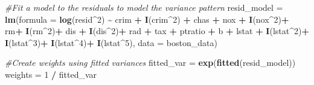 \documentclass[
]{article}
\newenvironment{Shaded}{\begin{snugshade}}{\end{snugshade}}
\newcommand{\AttributeTok}[1]{\textcolor[rgb]{0.13,0.29,0.53}{#1}}
\newcommand{\CommentTok}[1]{\textcolor[rgb]{0.56,0.35,0.01}{\textit{#1}}}
\newcommand{\DecValTok}[1]{\textcolor[rgb]{0.00,0.00,0.81}{#1}}
\newcommand{\FunctionTok}[1]{\textcolor[rgb]{0.13,0.29,0.53}{\textbf{#1}}}
\newcommand{\NormalTok}[1]{#1}
\newcommand{\OtherTok}[1]{\textcolor[rgb]{0.56,0.35,0.01}{#1}}
\newcommand{\SpecialCharTok}[1]{\textcolor[rgb]{0.81,0.36,0.00}{\textbf{#1}}}
\begin{document}
\begin{Shaded}
\begin{Highlighting}[]
\CommentTok{\#Fit a model to the residuals to model the variance pattern}
\NormalTok{resid\_model }\OtherTok{=} \FunctionTok{lm}\NormalTok{(}\AttributeTok{formula =} \FunctionTok{log}\NormalTok{(resid}\SpecialCharTok{\^{}}\DecValTok{2}\NormalTok{) }\SpecialCharTok{\textasciitilde{}}\NormalTok{ crim }\SpecialCharTok{+} \FunctionTok{I}\NormalTok{(crim}\SpecialCharTok{\^{}}\DecValTok{2}\NormalTok{) }\SpecialCharTok{+}\NormalTok{ chas }\SpecialCharTok{+}\NormalTok{ nox }\SpecialCharTok{+} \FunctionTok{I}\NormalTok{(nox}\SpecialCharTok{\^{}}\DecValTok{2}\NormalTok{)}\SpecialCharTok{+}\NormalTok{ rm}\SpecialCharTok{+} \FunctionTok{I}\NormalTok{(rm}\SpecialCharTok{\^{}}\DecValTok{2}\NormalTok{)}\SpecialCharTok{+}\NormalTok{ dis }\SpecialCharTok{+} \FunctionTok{I}\NormalTok{(dis}\SpecialCharTok{\^{}}\DecValTok{2}\NormalTok{)}\SpecialCharTok{+}\NormalTok{ rad }\SpecialCharTok{+}\NormalTok{ tax }\SpecialCharTok{+}\NormalTok{ ptratio }\SpecialCharTok{+}\NormalTok{ b }\SpecialCharTok{+}\NormalTok{ lstat }\SpecialCharTok{+} \FunctionTok{I}\NormalTok{(lstat}\SpecialCharTok{\^{}}\DecValTok{2}\NormalTok{)}\SpecialCharTok{+} \FunctionTok{I}\NormalTok{(lstat}\SpecialCharTok{\^{}}\DecValTok{3}\NormalTok{)}\SpecialCharTok{+} \FunctionTok{I}\NormalTok{(lstat}\SpecialCharTok{\^{}}\DecValTok{4}\NormalTok{)}\SpecialCharTok{+} \FunctionTok{I}\NormalTok{(lstat}\SpecialCharTok{\^{}}\DecValTok{5}\NormalTok{), }\AttributeTok{data =}\NormalTok{ boston\_data)}
\end{Highlighting}
\end{Shaded}

\begin{Shaded}
\begin{Highlighting}[]
\CommentTok{\#Create weights using fitted variances}
\NormalTok{fitted\_var }\OtherTok{=} \FunctionTok{exp}\NormalTok{(}\FunctionTok{fitted}\NormalTok{(resid\_model))}
\NormalTok{weights }\OtherTok{=} \DecValTok{1} \SpecialCharTok{/}\NormalTok{ fitted\_var}
\end{Highlighting}
\end{Shaded}
\end{document}
